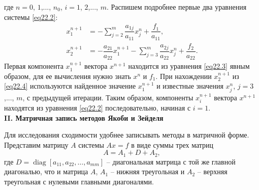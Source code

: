 где $n=0$, $1$,..., $n_{0}$, $i=1$, $2$,..., $m$. 
Распишем подробнее первые два уравнения системы \eqref{eq22.2}: 
\begin{align}
\label{eq22.3}
    x_{1}^{n+1} &=-\sum ^{m}_{j=2}\dfrac{a_{1j}}{a_{11}}x_{j}^{n}+\dfrac{f_{1}}{a_{11}},\\
\label{eq22.4}
x_{2}^{n+1}&=-\dfrac{a_{21}}{a_{22}}x_{1}^{n+1}-\sum ^{m}_{j=3}\dfrac{a_{2j}}{a_{22}}x_{j}^{n}+\dfrac{f_{2}}{a_{22}}.
\end{align}
Первая компонента $x_{1}^{n+1}$ вектора $x^{n+1}$ находится из уравнения \eqref{eq22.3} явным образом, для ее вычисления нужно знать $x^{n}$ и $f_1$. 
При нахождении $x_{2}^{n+1}$ из \eqref{eq22.4} используются найденное значение $x_{1}^{n+1}$ и известные значения $x_{j}^{n}$, $j=3$,..., $m$, с предыдущей итерации. Таким образом, компоненты $x_{i}^{n+1}$ вектора $x^{n+1}$ находятся из уравнения \eqref{eq22.2} последовательно, начиная с $i=1$.\\

\textbf{II. Матричная запись методов Якоби и Зейделя}

\par Для исследования сходимости удобнее записывать методы в матричной форме. 
Представим матрицу $A$ системы $Ax=f$ в виде суммы трех матриц 
$$A=A_{1}+D+A_{2},$$ 
где $D=\operatorname{diag}\left[ a_{11},a_{22},\ldots,a_{mm}\right]$ -- диагональная матрица с той же главной диагональю, что и матрица $A$, $A_{1}$ -- нижняя треугольная и $A_{2}$ -- верхняя треугольная с нулевыми главными диагоналями. 

